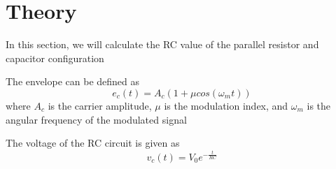 \section{Theory} \label{Theory}

In this section, we will calculate the RC value of the parallel resistor and capacitor configuration

The envelope can be defined as
\begin{equation}
    e_c(t)=A_c(1+\mu cos(\omega_mt))
\end{equation}
where $A_c$ is the carrier amplitude, $\mu$ is the modulation index, and $\omega_m$ is the angular frequency of the modulated signal

The voltage of the RC circuit is given as
\begin{equation}
    v_c(t)=V_0e^{-\frac{t}{RC}}
\end{equation}

